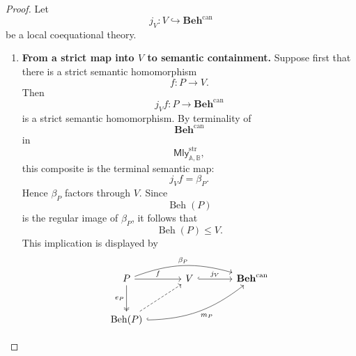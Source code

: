 \begin{proof}
    Let
    \[
        j_V:V\hookrightarrow
        \mathbf{Beh}^{\mathrm{can}}
    \]
    be a local coequational theory.

    \begin{enumerate}
        \item \textbf{From a strict map into \(V\) to semantic containment.}
        Suppose first that there is a strict semantic homomorphism
        \[
            f:P\to V.
        \]
        Then
        \[
            j_Vf:P\to\mathbf{Beh}^{\mathrm{can}}
        \]
        is a strict semantic homomorphism. By terminality of
        \[
            \mathbf{Beh}^{\mathrm{can}}
        \]
        in
        \[
            \mathsf{Mly}^{\mathrm{str}}_{\mathbb A,\mathbb B},
        \]
        this composite is the terminal semantic map:
        \[
            j_Vf=\beta_P.
        \]
        Hence \(\beta_P\) factors through \(V\). Since
        \[
            \operatorname{Beh}(P)
        \]
        is the regular image of \(\beta_P\), it follows that
        \[
            \operatorname{Beh}(P)\leq V.
        \]
        This implication is displayed by
        \[
        \begin{tikzcd}[column sep=large, row sep=large]
            P
                \arrow[r, "f"]
                \arrow[rr, bend left=18, "\beta_P"]
                \arrow[d, two heads, "e_P"']
            &
            V
                \arrow[r, hook, "j_V"]
            &
            \mathbf{Beh}^{\mathrm{can}}
            \\
            \operatorname{Beh}(P)
                \arrow[ur, dashed]
                \arrow[urr, hook, "m_P"', bend right=18]
            &
            &
        \end{tikzcd}
        \]


\end{enumerate}
\end{proof}
